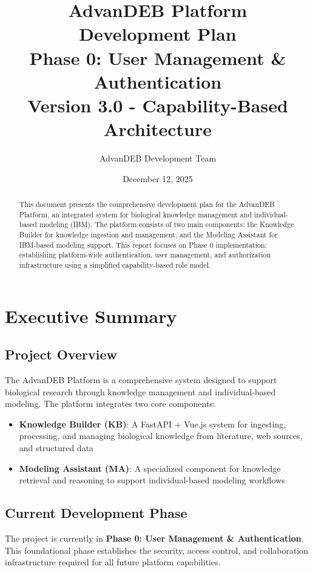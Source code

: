 \documentclass[12pt,a4paper]{article}
\title{
    \textbf{\Huge \textcolor{titlecolor}{AdvanDEB Platform}}\\
    \vspace{0.5cm}
    \Large Development Plan\\
    \large Phase 0: User Management \& Authentication\\
    \vspace{0.3cm}
    \normalsize Version 3.0 - Capability-Based Architecture
}
\author{AdvanDEB Development Team}
\date{December 12, 2025}
\begin{document}
\maketitle
\thispagestyle{empty}

\vspace{2cm}

\begin{abstract}
This document presents the comprehensive development plan for the AdvanDEB Platform, an integrated system for biological knowledge management and individual-based modeling (IBM). The platform consists of two main components: the Knowledge Builder for knowledge ingestion and management, and the Modeling Assistant for IBM-based modeling support. This report focuses on Phase 0 implementation: establishing platform-wide authentication, user management, and authorization infrastructure using a simplified capability-based role model.
\end{abstract}

\newpage
\tableofcontents
\newpage

\section{Executive Summary}

\subsection{Project Overview}
The AdvanDEB Platform is a comprehensive system designed to support biological research through knowledge management and individual-based modeling. The platform integrates two core components:

\begin{itemize}[leftmargin=*]
    \item \textbf{Knowledge Builder (KB)}: A FastAPI + Vue.js system for ingesting, processing, and managing biological knowledge from literature, web sources, and structured data
    \item \textbf{Modeling Assistant (MA)}: A specialized component for knowledge retrieval and reasoning to support individual-based modeling workflows
\end{itemize}

\subsection{Current Development Phase}
The project is currently in \textbf{Phase 0: User Management \& Authentication}. This foundational phase establishes the security, access control, and collaboration infrastructure required for all future platform capabilities.
\end{document}

